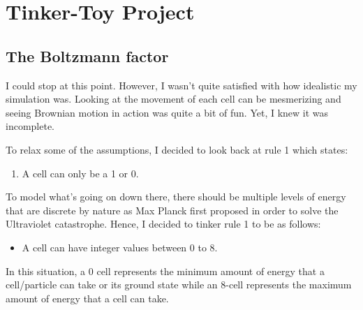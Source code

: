 \chapter{Tinker-Toy Project}
\section{The Boltzmann factor}
I could stop at this point. However, I wasn't quite satisfied with how idealistic my simulation was. Looking at the movement of each cell can be mesmerizing and seeing Brownian motion in action was quite a bit of fun. Yet, I knew it was incomplete. \par

\vspace{0.3cm}
To relax some of the assumptions, I decided to look back at rule 1 which states: 
\begin{enumerate}
    \item A cell can only be a 1 or 0.
\end{enumerate}
To model what's going on down there, there should be multiple levels of energy that are discrete by nature as Max Planck first proposed in order to solve the Ultraviolet catastrophe. Hence, I decided to tinker rule 1 to be as follows: 
\begin{itemize}
    \item A cell can have integer values between 0 to 8.
\end{itemize}
In this situation, a 0 cell represents the minimum amount of energy that a cell/particle can take or its ground state while an 8-cell represents the maximum amount of energy that a cell can take. \par

